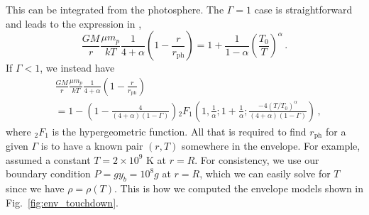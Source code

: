 \documentclass[../main.tex]{subfiles}
\begin{document}
This can be integrated from the photosphere. The $\Gamma=1$ case is straightforward and leads to the expression in \citet{Paczynski1986a},
\begin{equation}
	\frac{GM}{r}\frac{\mu m_p}{kT}\frac{1}{4+\alpha}\left(1-\frac{r}{r_\text{ph}}\right)=1+\frac{1}{1-\alpha}\left(\frac{T_0}{T}\right)^\alpha \,.
\end{equation}
If $\Gamma<1$, we instead have 
\begin{align}
	&\frac{GM}{r}\frac{\mu m_p}{kT}\frac{1}{4+\alpha}\left(1-\frac{r}{r_\text{ph}}\right)\nonumber\\
	&=1-\left(1-\frac{4}{(4+\alpha)(1-\Gamma)}\right){}_2F_1\left(1,\frac{1}{\alpha};1+\frac{1}{\alpha};\frac{-4(T/T_0)^\alpha}{(4+\alpha)(1-\Gamma)}\right)\,,
\end{align}
where ${}_2F_1$ is the hypergeometric function.  All that is required to find $r_\text{ph}$ for a given $\Gamma$ is to have a known pair $(r,T)$ somewhere in the envelope. For example, \citet{Paczynski1986a} assumed a constant $T=2\times10^9$ K at $r=R$. For consistency, we use our boundary condition $P=gy_b=10^8g$ at $r=R$, which we can easily solve for $T$ since we have $\rho=\rho(T)$. This is how we computed the envelope models shown in Fig.~\ref{fig:env_touchdown}.

\biblio
\end{document}
